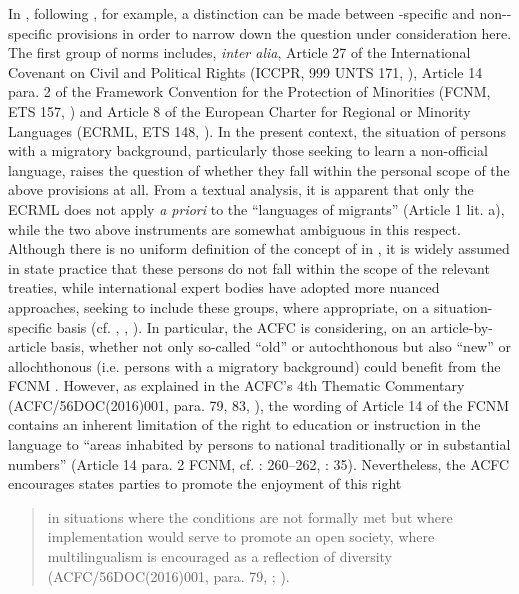 \documentclass[output=paper,colorlinks,citecolor=brown]{langscibook}
\begin{document}
In , following \citet[38 et seq.]{henrard2013}, for example, a distinction can be made between -specific and non--specific provisions in order to narrow down the question under consideration here. The first group of norms includes, \textit{inter alia}, Article 27 of the International Covenant on Civil and Political Rights (ICCPR, 999 UNTS 171, \citealt{un_iccpr_1966}), Article 14 para. 2 of the Framework Convention for the Protection of  Minorities (FCNM, ETS 157, \citealt{fcnm1995}) and Article 8 of the European Charter for Regional or Minority Languages (ECRML, ETS 148, \citealt{ecrml2024}). In the present context, the situation of persons with a migratory background, particularly those seeking to learn a non-official language, raises the question of whether they fall within the personal scope of the above provisions at all. From a textual analysis, it is apparent that only the ECRML does not apply \textit{a priori} to the ``languages of migrants'' (Article 1 lit. a), while the two above instruments are somewhat ambiguous in this respect. Although there is no uniform definition of the concept of  in , it is widely assumed in state practice that these persons do not fall within the scope of the relevant treaties, while international expert bodies have adopted more nuanced approaches, seeking to include these groups, where appropriate, on a situation-specific basis (cf. \citealt[para. 4--5]{hofmann2007_minorities}, \citealt{malkmus2023a}, \citealt{hofmann_malkmus2023a}). In particular, the ACFC is considering, on an article-by-article basis, whether not only so-called ``old'' or autochthonous  but also ``new'' or allochthonous  (i.e. persons with a migratory background) could benefit from the FCNM \citep{palermo2019}. However, as explained in the ACFC's 4th Thematic Commentary (ACFC/56DOC(2016)001, para. 79, 83, \citealt{acfc2016}), the wording of Article 14 of the FCNM contains an inherent limitation of the right to education or instruction in the  language to ``areas inhabited by persons  to national  traditionally or in substantial numbers'' (Article 14 para. 2 FCNM, cf. \citealt{busch2018}: 260--262, \citealt{hofmann2023a}: 35). Nevertheless, the ACFC encourages states parties to promote the enjoyment of this right

\begin{quote}
    in situations where the conditions are not formally met but where implementation would serve to promote an open society, where multilingualism is encouraged as a reflection of diversity (ACFC/{\allowbreak}56DOC{\allowbreak}(2016)001, para. 79, \citealt{acfc2016}; \citealt[24]{palermo2019}).
\end{quote}
\end{document}
